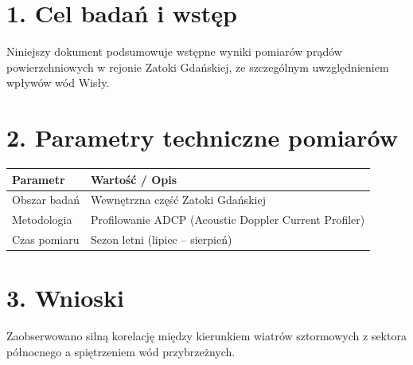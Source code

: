 \section*{1. Cel badań i wstęp}
Niniejszy dokument podsumowuje wstępne wyniki pomiarów prądów powierzchniowych w rejonie Zatoki Gdańskiej, ze szczególnym uwzględnieniem wpływów wód Wisły.

\section*{2. Parametry techniczne pomiarów}
\begin{tabularx}{\textwidth}{lX}
\toprule
\textbf{Parametr} & \textbf{Wartość / Opis} \\
\midrule
Obszar badań & Wewnętrzna część Zatoki Gdańskiej \\
Metodologia & Profilowanie ADCP (Acoustic Doppler Current Profiler) \\
Czas pomiaru & Sezon letni (lipiec -- sierpień) \\
\bottomrule
\end{tabularx}

\section*{3. Wnioski}
Zaobserwowano silną korelację między kierunkiem wiatrów sztormowych z sektora północnego a spiętrzeniem wód przybrzeżnych.
